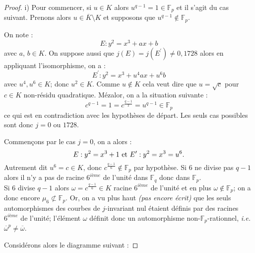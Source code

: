 \documentclass[a4paper]{article} %
\numberwithin{equation}{section}
\newcommand\GF[1]{\mathbb{F}_{#1}}
\begin{document}
\begin{proof} 
i) Pour commencer, si $u\in K$ alors $u^{q-1} = 1\in \GF{p}$ et il s'agit du cas suivant. Prenons alors $u\in\overline{K}\setminus K$ et supposons que $u^{q-1}\not\in \GF{p}$. \par
On note :
\[E : y^2 = x^3 + ax + b\] 
avec $a$, $b\in K$. On suppose aussi que $j(E) = j(E^{\prime})\neq 0, 1728$ alors en appliquant l'isomorphisme, on a :
\[E^{\prime} : y^2 = x^3 + u^4ax + u^6b\]
avec $u^4, u^6\in K$; donc $u^2\in K$. Comme $u\not\in K$ cela veut dire que $u = \sqrt{c}$ pour $c\in K$ non-résidu quadratique. Mézalor, on a la situation suivante :
\[c^{q-1} = 1 = c^{\tfrac{q-1}{2}} = u^{q-1}\in \GF{p}\]
ce qui est en contradiction avec les hypothèses de départ. Les seuls cas possibles sont donc $j = 0$ ou $1728$.\par
Commençons par le cas $j = 0$, on a alors :
\[E : y^2 = x^3 + 1 \textup{ et } E^{\prime} : y^2 = x^3 = u^6.\]
Autrement dit $u^6 = c \in K$, donc $c^{\tfrac{q-1}{6}} \notin \GF{p}$ par hypothèse. Si $6$ ne divise pas $q-1$ alors il n'y a pas de racine $6^{\textit{ième}}$ de l'unité dans $\GF{q}$ donc dans $\GF{p}$.\\
Si $6$ divise $q-1$ alors $\omega = c^{\tfrac{q-1}{6}}\in K$ racine $6^{\textit{ième}}$ de l'unité et en plus $\omega\notin\GF{p}$; on a donc encore $\mu_6\not\subset\GF{p}$. Or, on a vu plus haut \textit{(pas encore écrit)} que les seuls automorphismes des courbes de $j$-invariant nul étaient définis par des racines $6^{\textit{ième}}$ de l'unité; l'élément $\omega$ définit donc un automorphisme non-$\GF{p}$-rationnel, \textit{i.e.} $\overline{\omega}^p\neq \overline{\omega}$.\par
Considérons alors le diagramme suivant :


\end{proof}
\end{document}
